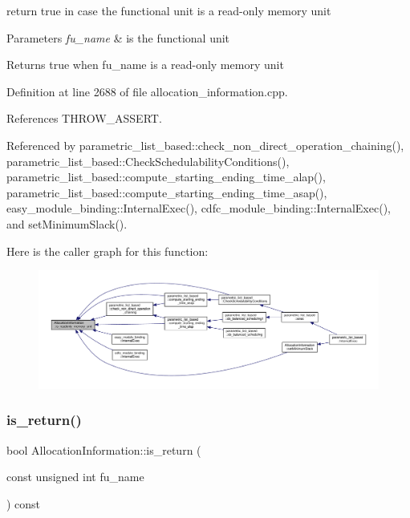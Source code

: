 return true in case the functional unit is a read-\/only memory unit 


\begin{DoxyParams}{Parameters}
{\em fu\+\_\+name} & is the functional unit \\
\hline
\end{DoxyParams}
\begin{DoxyReturn}{Returns}
true when fu\+\_\+name is a read-\/only memory unit 
\end{DoxyReturn}


Definition at line 2688 of file allocation\+\_\+information.\+cpp.



References T\+H\+R\+O\+W\+\_\+\+A\+S\+S\+E\+RT.



Referenced by parametric\+\_\+list\+\_\+based\+::check\+\_\+non\+\_\+direct\+\_\+operation\+\_\+chaining(), parametric\+\_\+list\+\_\+based\+::\+Check\+Schedulability\+Conditions(), parametric\+\_\+list\+\_\+based\+::compute\+\_\+starting\+\_\+ending\+\_\+time\+\_\+alap(), parametric\+\_\+list\+\_\+based\+::compute\+\_\+starting\+\_\+ending\+\_\+time\+\_\+asap(), easy\+\_\+module\+\_\+binding\+::\+Internal\+Exec(), cdfc\+\_\+module\+\_\+binding\+::\+Internal\+Exec(), and set\+Minimum\+Slack().

Here is the caller graph for this function\+:
\nopagebreak
\begin{figure}[H]
\begin{center}
\leavevmode
\includegraphics[width=350pt]{d7/d79/classAllocationInformation_a02860cc61e2f5514c55a2f3db8de70b3_icgraph}
\end{center}
\end{figure}
\mbox{\label{classAllocationInformation_a591cf1df78a6a6a8261906316a9185a4}} 
\subsubsection{\texorpdfstring{is\+\_\+return()}{is\_return()}}
{\footnotesize\ttfamily bool Allocation\+Information\+::is\+\_\+return (\begin{DoxyParamCaption}\item[{const unsigned int}]{fu\+\_\+name }\end{DoxyParamCaption}) const}



